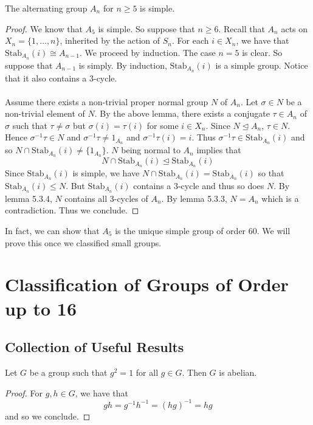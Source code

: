 \documentclass[a4paper]{article}
\begin{document}
\begin{thm}{}{} The alternating group $A_n$ for $n\geq 5$ is simple. \tcbline
\begin{proof}
We know that $A_5$ is simple. So suppose that $n\geq 6$. Recall that $A_n$ acts on $X_n=\{1,\dots,n\}$, inherited by the action of $S_n$. For each $i\in X_n$, we have that $\text{Stab}_{A_n}(i)\cong A_{n-1}$. We proceed by induction. The case $n=5$ is clear. So suppose that $A_{n-1}$ is simply. By induction, $\text{Stab}_{A_n}(i)$ is a simple group. Notice that it also contains a $3$-cycle. \\~\\

Assume there exists a non-trivial proper normal group $N$ of $A_n$. Let $\sigma\in N$ be a non-trivial element of $N$. By the above lemma, there exists a conjugate $\tau\in A_n$ of $\sigma$ such that $\tau\neq\sigma$ but $\sigma(i)=\tau(i)$ for some $i\in X_n$. Since $N\trianglelefteq A_n$, $\tau\in N$. Hence $\sigma^{-1}\tau\in N$ and $\sigma^{-1}\tau\neq 1_{A_n}$ and $\sigma^{-1}\tau(i)=i$. Thus $\sigma^{-1}\tau\in\text{Stab}_{A_n}(i)$ and so $N\cap\text{Stab}_{A_n}(i)\neq\{1_{A_n}\}$. $N$ being normal to $A_n$ implies that $$N\cap\text{Stab}_{A_n}(i)\trianglelefteq\text{Stab}_{A_n}(i)$$ Since $\text{Stab}_{A_n}(i)$ is simple, we have $N\cap\text{Stab}_{A_n}(i)=\text{Stab}_{A_n}(i)$ so that $\text{Stab}_{A_n}(i)\leq N$. But $\text{Stab}_{A_n}(i)$ contains a $3$-cycle and thus so does $N$. By lemma 5.3.4, $N$ contains all $3$-cycles of $A_n$. By lemma 5.3.3, $N=A_n$ which is a contradiction. Thus we conclude. 
\end{proof}
\end{thm}

In fact, we can show that $A_5$ is the unique simple group of order $60$. We will prove this once we classified small groups. 

\pagebreak
\section{Classification of Groups of Order up to 16}
\subsection{Collection of Useful Results}
\begin{lmm}{}{} Let $G$ be a group such that $g^2=1$ for all $g\in G$. Then $G$ is abelian. \tcbline
\begin{proof}
For $g,h\in G$, we have that $$gh=g^{-1}h^{-1}=(hg)^{-1}=hg$$ and so we conclude. 
\end{proof}
\end{lmm}
\end{document}
